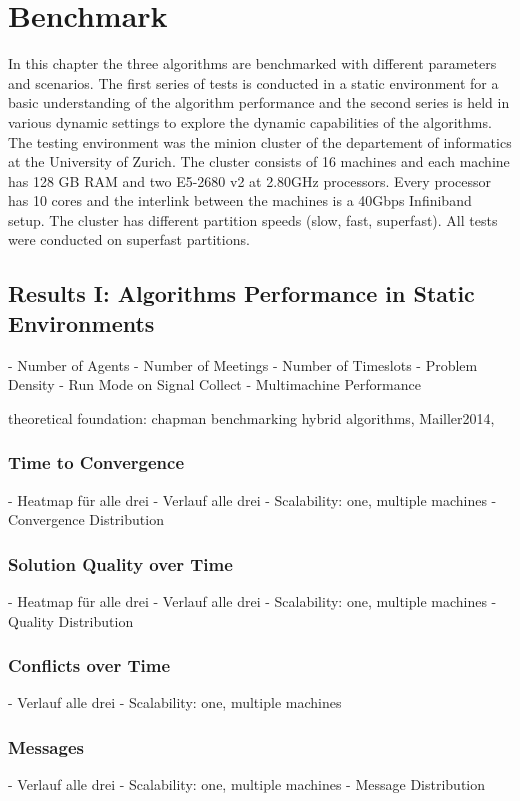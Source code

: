 \chapter{Benchmark}

In this chapter the three algorithms are benchmarked with different parameters and scenarios. The first series of tests is conducted in a static environment for a basic understanding of the algorithm performance and the second series is held in various dynamic settings to explore the dynamic capabilities of the algorithms. The testing environment was the minion cluster of the departement of informatics at the University of Zurich. The cluster consists of 16 machines and each machine has 128 GB RAM and two E5-2680 v2 at 2.80GHz processors. Every processor has 10 cores and the interlink between the machines is a 40Gbps Infiniband setup. The cluster has different partition speeds (slow, fast, superfast). All tests were conducted on superfast partitions.

\section{Results I: Algorithms Performance in Static Environments}

- Number of Agents
- Number of Meetings
- Number of Timeslots
- Problem Density
- Run Mode on Signal Collect
- Multimachine Performance

theoretical foundation: chapman benchmarking hybrid algorithms, Mailler2014, 

\subsection{Time to Convergence}
- Heatmap für alle drei
- Verlauf alle drei
- Scalability: one, multiple machines
- Convergence Distribution
\subsection{Solution Quality over Time}
- Heatmap für alle drei
- Verlauf alle drei
- Scalability: one, multiple machines
- Quality Distribution
\subsection{Conflicts over Time}
- Verlauf alle drei
- Scalability: one, multiple machines
\subsection{Messages}
-  Verlauf alle drei
- Scalability: one, multiple machines
- Message Distribution

